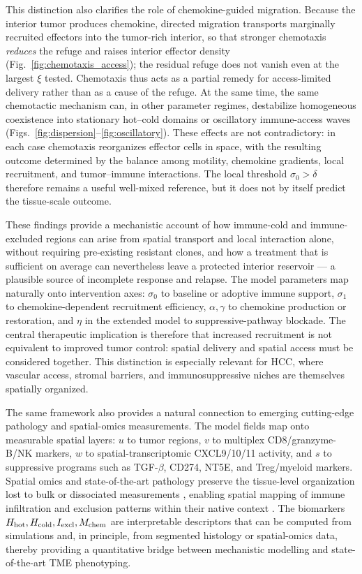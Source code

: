 \documentclass[]{interact}
\theoremstyle{plain}%
\theoremstyle{definition}
\theoremstyle{remark}
\begin{document}
This distinction also clarifies the role of chemokine-guided migration. Because
the interior tumor produces chemokine, directed migration transports marginally
recruited effectors into the tumor-rich interior, so that stronger chemotaxis
\emph{reduces} the refuge and raises interior effector density
(Fig.~\ref{fig:chemotaxis_access}); the residual refuge does not vanish even at
the largest $\xi$ tested. Chemotaxis thus acts as a partial remedy for
access-limited delivery rather than as a cause of the refuge. At the same time,
the same chemotactic mechanism can, in other parameter regimes, destabilize
homogeneous coexistence into stationary hot--cold domains or oscillatory
immune-access waves (Figs.~\ref{fig:dispersion}--\ref{fig:oscillatory}). These
effects are not contradictory: in each case chemotaxis reorganizes effector
cells in space, with the resulting outcome determined by the balance among
motility, chemokine gradients, local recruitment, and tumor--immune
interactions. The local threshold $\sigma_0>\delta$ therefore remains a useful
well-mixed reference, but it does not by itself predict the tissue-scale
outcome.

These findings provide a mechanistic account of how immune-cold and
immune-excluded regions can arise from spatial transport and local interaction
alone, without requiring pre-existing resistant clones, and how a treatment
that is sufficient on average can nevertheless leave a protected interior
reservoir --- a plausible source of incomplete response and relapse. The model
parameters map naturally onto intervention axes: $\sigma_0$ to baseline or
adoptive immune support, $\sigma_1$ to chemokine-dependent recruitment
efficiency, $\alpha,\gamma$ to chemokine production or restoration, and $\eta$
in the extended model to suppressive-pathway blockade. The central therapeutic
implication is therefore that increased recruitment is not equivalent to
improved tumor control: spatial delivery and spatial access must be considered
together. This distinction is especially relevant for HCC, where vascular
access, stromal barriers, and immunosuppressive niches are themselves
spatially organized.

The same framework also provides a natural connection to emerging cutting-edge
pathology and spatial-omics measurements. The model fields map onto measurable
spatial layers: $u$ to tumor regions, $v$ to multiplex
CD8/granzyme-B/NK markers, $w$ to spatial-transcriptomic CXCL9/10/11 activity,
and $s$ to suppressive programs such as TGF-$\beta$, CD274, NT5E, and
Treg/myeloid markers. Spatial omics and state-of-the-art pathology preserve the
tissue-level organization lost to bulk or dissociated measurements
\cite{rao2021exploring,moffitt2022emerging}, enabling spatial mapping of
immune infiltration and exclusion patterns within their native context
\cite{palla2022spatial}. The biomarkers
$H_{\rm hot},H_{\rm cold},I_{\rm excl},M_{\rm chem}$ are interpretable
descriptors that can be computed from simulations and, in principle, from
segmented histology or spatial-omics data, thereby providing a quantitative
bridge between mechanistic modelling and state-of-the-art TME phenotyping.
\end{document}
